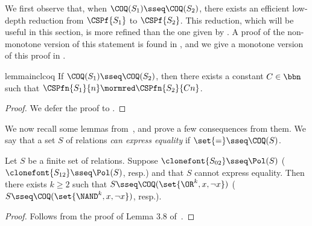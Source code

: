 \documentclass[11pt]{article}
\begin{document}
We first observe that, when $\COQ(S_1) \sseq \COQ(S_2)$,
there exists an efficient low-depth reduction
from $\CSPf{S_1}$ to $\CSPf{S_2}$.
This reduction, which will be useful in this section,
is more refined than the one given by
.
A proof of the non-monotone version of this statement
is found in
\cite[Proposition 2.3]{playing_two},
and we give a monotone version of this proof in
.

\begin{restatable}{lemma}{inclcoq}
    \label{prop:incl-coq}
    If $\COQ(S_1) \sseq \COQ(S_2)$,
    then
    there exists a constant $C \in \bbn$ such that
    $\CSPfn{S_1}{n} \mormred \CSPfn{S_2}{C n}$.
\end{restatable}
\begin{proof}
    We defer the proof to
    .
\end{proof}

We now recall some lemmas
from~\cite{DBLP:journals/jcss/AllenderBISV09},
and prove a few consequences from them.
We say that a set $S$ of relations \emph{can express equality} if
$\set{=} \sseq \COQ(S)$.

\begin{lemma}
    \label{lem:coq-no-eq}
    Let $S$ be a finite set of relations.
    Suppose
    $\clonefont{S_{02}} \sseq \Pol(S)$
    ($\clonefont{S_{12}} \sseq \Pol(S)$, resp.)
    and that $S$ cannot express equality.
    Then there exists $k \geq 2$
    such that
    $S \sseq \COQ(\set{\OR^k, x, \neg x})$
    ($S \sseq \COQ(\set{\NAND^k, x, \neg x})$, resp.).
\end{lemma}
\begin{proof}
    Follows from the proof of Lemma 3.8
    of~\cite{DBLP:journals/jcss/AllenderBISV09}.
\end{proof}
\end{document}
